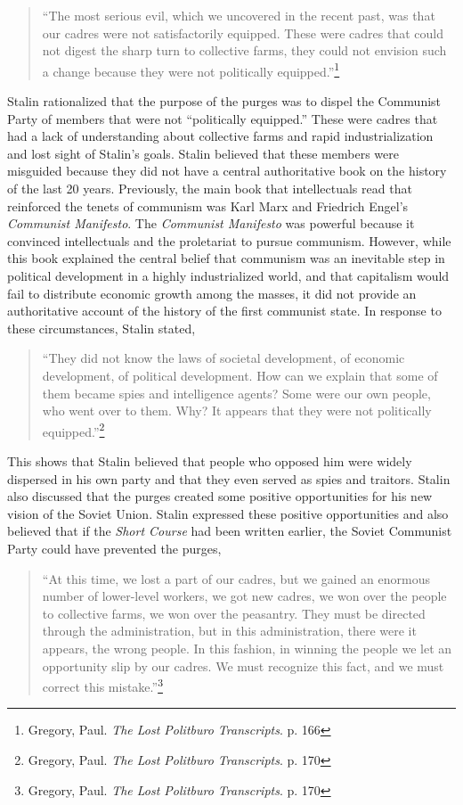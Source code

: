 \documentclass[a4paper, twocolumn]{article}
\begin{document}
\begin{quote}
``The most serious evil, which we uncovered in the recent past, was
that our cadres were not satisfactorily equipped. These were cadres
that could not digest the sharp turn to collective farms, they could
not envision such a change because they were not politically
equipped.''\footnote{Gregory, Paul. \emph{The Lost Politburo Transcripts}. p. 166}
\end{quote}

Stalin rationalized that the purpose of the purges was to dispel the
Communist Party of members that were not ``politically equipped.'' These
were cadres that had a lack of understanding about collective farms
and rapid industrialization and lost sight of Stalin’s goals.  Stalin
believed that these members were misguided because they did not have a
central authoritative book on the history of the last 20
years. Previously, the  main book that intellectuals read that
reinforced the tenets of communism was Karl Marx and Friedrich Engel’s
\emph{Communist Manifesto}. The \emph{Communist Manifesto} was powerful because it
convinced intellectuals and the proletariat to pursue
communism. However, while this book explained the central belief that
communism was an inevitable step in political development in a highly
industrialized world, and that capitalism would fail to distribute
economic growth among the masses, it did not provide an authoritative
account of the history of the first communist state. In response to
these circumstances, Stalin stated,

\begin{quote}
``They did not know the laws of societal development, of economic
development, of political development. How can we explain that some of
them became spies and intelligence agents? Some were our own people,
who went over to them. Why? It appears that they were not politically
equipped.''\footnote{Gregory, Paul. \emph{The Lost Politburo Transcripts}. p. 170}
\end{quote}

This shows that Stalin believed that people who opposed him were
widely dispersed in his own party and that they even served as spies
and traitors. Stalin also discussed that the purges created some
positive opportunities for his new vision of the Soviet Union. Stalin
expressed these positive opportunities and also believed that
if the \emph{Short Course} had been written earlier, the Soviet
Communist Party could have prevented the purges,

 \begin{quote}
``At this time, we lost a part of our cadres, but we gained an enormous
number of lower-level workers, we got new cadres, we won over the
people to collective farms, we won over the peasantry. They must be
directed through the administration, but in this administration, there
were it appears, the wrong people. In this fashion, in winning the
people we let an opportunity slip by our cadres. We must recognize
this fact, and we must correct this mistake.''\footnote{Gregory, Paul. \emph{The Lost Politburo Transcripts}. p. 170}
\end{quote}
\end{document}
